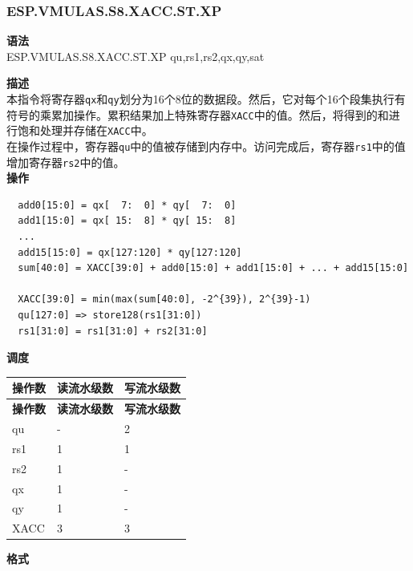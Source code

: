 \newpage

\newpage
\subsubsection{ESP.VMULAS.S8.XACC.ST.XP}\label{instruction:ESPVMULASS8XACCSTXP}
\textbf{语法}\\
ESP.VMULAS.S8.XACC.ST.XP qu,rs1,rs2,qx,qy,sat

\textbf{描述}\\
本指令将寄存器\lstinline{qx}和\lstinline{qy}划分为16个8位的数据段。然后，它对每个16个段集执行有符号的乘累加操作。累积结果加上特殊寄存器\lstinline{XACC}中的值。然后，将得到的和进行饱和处理并存储在\lstinline{XACC}中。\\ 在操作过程中，寄存器\lstinline{qu}中的值被存储到内存中。访问完成后，寄存器\lstinline{rs1}中的值增加寄存器\lstinline{rs2}中的值。\\
\textbf{操作}
\begin{lstlisting}
  add0[15:0] = qx[  7:  0] * qy[  7:  0]
  add1[15:0] = qx[ 15:  8] * qy[ 15:  8]
  ...
  add15[15:0] = qx[127:120] * qy[127:120]
  sum[40:0] = XACC[39:0] + add0[15:0] + add1[15:0] + ... + add15[15:0]

  XACC[39:0] = min(max(sum[40:0], -2^{39}), 2^{39}-1)
  qu[127:0] => store128(rs1[31:0])
  rs1[31:0] = rs1[31:0] + rs2[31:0]
\end{lstlisting}

\textbf{调度}\\
\begin{longtable}[c]{|l|l|l|}
    \hline
    \rowcolor{lightgray}
    \textbf{操作数} & \textbf{读流水级数} & \textbf{写流水级数} \\\hline
    \endfirsthead
    \hline
    \rowcolor{lightgray}
     \textbf{操作数} & \textbf{读流水级数} & \textbf{写流水级数} \\\hline
    \endhead
    \hline
    \endfoot

    qu & - & 2 \\\hline
    rs1 & 1 & 1 \\\hline
    rs2 & 1 & - \\\hline
     qx & 1 & - \\\hline
     qy & 1 & - \\\hline
     XACC & 3 & 3

\end{longtable}

\textbf{格式}\\

